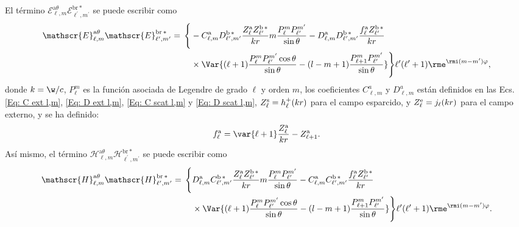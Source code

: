 
El término $\mathscr{E}_{\ell, m}^{\text{a}\theta}\mathscr{E}_{\ell^{\prime}, m^{\prime}}^{\text{br}\,*}$ se puede escribir como
\begin{align}
\mathscr{E}_{\ell, m}^{\text{a}\theta}\mathscr{E}_{\ell^{\prime}, m^{\prime}}^{\text{br}\,*}= \, \Bigg\{&-C_{\ell,m}^{\rm a}D_{\ell^{\prime}, m^{\prime}}^{\rm b \, *}\frac{Z_{\ell}^{\rm a}Z_{\ell^{\prime}}^{\rm b\, *}}{k r} m \frac{P_{\ell}^{m}P_{\ell^{\prime}}^{m^{\prime}}}{\sin\theta}-D_{\ell, m}^{\rm a}D_{\ell^{\prime}, m^{\prime}}^{\rm b \, *} \frac{f_{\ell}^{\rm a}Z_{\ell^{\prime}}^{\rm b \, *}}{k r}\nonumber\\
& \times \Var{(\ell+1) \frac{P_{\ell}^m P_{\ell^{\prime}}^{m^{\prime}}\cos\theta}{\sin\theta}-(l-m+1)\frac{P_{\ell+1}^{m}P_{\ell^{\prime}}^{m^{\prime}}}{\sin\theta}}\Bigg\}\ell^{\prime}(\ell^{\prime}+1)  \rme^{\rmi (m-m^{\prime})\varphi },
\end{align}
donde $k=\w/c$, $P_{\ell}^{m}$ es la función asociada de Legendre de grado $\ell$ y orden $m$, los coeficientes $C_{\ell, m}^{a}$ y $D_{\ell, m}^{a}$ están definidos en las Ecs. \eqref{Eq: C ext l,m}, \eqref{Eq: D ext l,m}, \eqref{Eq: C scat l,m} y \eqref{Eq: D scat l,m},  $Z_{\ell}^{\rm s}=h_{\ell}^{+}(k r)$ para el campo esparcido, y $Z_{\ell}^{\rm e}=j_{\ell}(k r)$ para el campo externo, y se ha definido:
\begin{equation}
f_{\ell}^{\rm a}= \var{\ell + 1} \frac{Z_{\ell}^{\rm a}}{k r}-Z_{\ell+1}^{\rm a}.
\end{equation}
%
Así mismo, el término $\mathscr{H}_{\ell, m}^{\text{a}\theta}\mathscr{H}_{\ell^{\prime}, m^{\prime}}^{\text{br}\,*}$ se puede escribir como
\begin{align}
\mathscr{H}_{\ell, m}^{\text{a}\theta}\mathscr{H}_{\ell^{\prime}, m^{\prime}}^{\text{br}\,*}= \, \Bigg\{& D_{\ell,m}^{\rm a}C_{\ell^{\prime}, m^{\prime}}^{\rm b \, *}\frac{Z_{\ell}^{\rm a}Z_{\ell^{\prime}}^{\rm b\, *}}{k r} m \frac{P_{\ell}^{m}P_{\ell^{\prime}}^{m^{\prime}}}{\sin\theta}-C_{\ell, m}^{\rm a}C_{\ell^{\prime}, m^{\prime}}^{\rm b \, *} \frac{f_{\ell}^{\rm a}Z_{\ell^{\prime}}^{\rm b \, *}}{k r}\nonumber\\
& \times \Var{(\ell+1) \frac{P_{\ell}^m P_{\ell^{\prime}}^{m^{\prime}}\cos\theta}{\sin\theta}-(l-m+1)\frac{P_{\ell+1}^{m}P_{\ell^{\prime}}^{m^{\prime}}}{\sin\theta}}\Bigg\}\ell^{\prime}(\ell^{\prime}+1)  \rme^{\rmi (m-m^{\prime})\varphi }.
\end{align}
